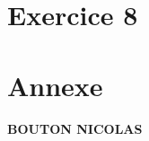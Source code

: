 \documentclass[12pt, letterpaper]{article}
\begin{document}
\section*{Exercice 8}

\newpage

\section*{Annexe}

\textbf{BOUTON NICOLAS}



\newpage



\newpage



\newpage



\newpage



\newpage


\end{document}
